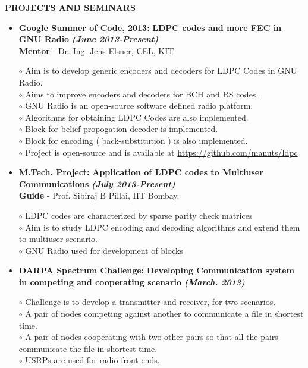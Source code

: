 \documentclass[a4paper,10pt]{article}
\begin{document}
 \colorbox{titleColor}{\parbox{6.5in}{\textbf{PROJECTS AND SEMINARS}}}

 \begin{itemize}
 \setlength{\itemsep}{1pt}
 
 \item \textbf{Google Summer of Code, 2013:} \textbf{LDPC codes and more FEC in GNU Radio}  \textbf \emph{(June 2013-Present)}\\
        {\textbf{Mentor} - Dr.-Ing. Jens Elsner, CEL, KIT.   }          %

        $\circ$ Aim is to develop generic encoders and decoders for LDPC Codes in GNU Radio. \\
        $\circ$ Aims to improve encoders and decoders for BCH and RS codes. \\
        $\circ$ GNU Radio is an open-source software defined radio platform. \\
        $\circ$ Algorithms for obtaining LDPC Codes are also implemented. \\
        $\circ$ Block for belief propogation decoder is implemented. \\
        $\circ$ Block for encoding ( back-substitution ) is also implemented. \\
        $\circ$ Project is open-source and is available at \url{https://github.com/manuts/ldpc}

        \item \textbf{M.Tech. Project:} \textbf{Application of LDPC codes to Multiuser Communications} \textbf \emph{(July 2013-Present)} \\
        {\textbf{Guide} - Prof. Sibiraj B Pillai, IIT Bombay.}            %
        
$\circ$ LDPC codes are characterized by sparse parity check matrices \\ 
$\circ$ Aim is to study LDPC encoding and decoding algorithms and extend them to multiuser scenario. \\
$\circ$ GNU Radio used for development of blocks

        
\item \textbf{DARPA Spectrum Challenge:} \textbf{Developing Communication system in competing and cooperating scenario}
\textbf \emph{(March. 2013)}

$\circ$ Challenge is to develop a transmitter and receiver, for two scenarios. \\
$\circ$ A pair of nodes competing against another to communicate a file in shortest time. \\
$\circ$ A pair of nodes cooperating with two other pairs so that all the pairs communicate the file in shortest time. \\
$\circ$ USRPs are used for radio front ends.


\end{itemize}
\end{document}
